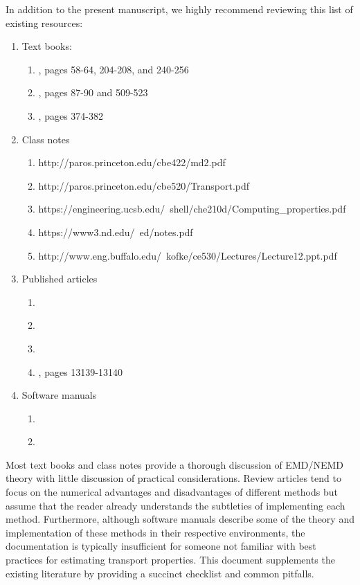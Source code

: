 \documentclass[9pt]{livecoms}
\begin{document}
In addition to the present manuscript, we highly recommend reviewing this list of existing resources:
\begin{enumerate}
	\item Text books:
	\begin{enumerate}
		\item \cite{Allen1987}, pages 58-64, 204-208, and 240-256
		\item \cite{Frenkel2002}, pages 87-90 and 509-523
		\item \cite{Leach2001}, pages 374-382
	\end{enumerate}
	\item Class notes
	\begin{enumerate}
		\item http://paros.princeton.edu/cbe422/md2.pdf
		\item http://paros.princeton.edu/cbe520/Transport.pdf
		\item https://engineering.ucsb.edu/~shell/che210d/Computing\_properties.pdf
		\item https://www3.nd.edu/~ed/notes.pdf
		\item http://www.eng.buffalo.edu/~kofke/ce530/Lectures/Lecture12.ppt.pdf
	\end{enumerate}
	\item Published articles
	\begin{enumerate}
		\item \cite{Hess2002}
		\item \cite{Chen2009}
		\item \cite{Ungerer2007}
		\item \cite{Nieto2015}, pages 13139-13140
	\end{enumerate}
	\item Software manuals
	\begin{enumerate}
		\item \cite{GROMACS}
		\item \cite{LAMMPS}
	\end{enumerate}
\end{enumerate}
Most text books and class notes provide a thorough discussion of EMD/NEMD theory with little discussion of practical considerations. Review articles tend to focus on the numerical advantages and disadvantages of different methods but assume that the reader already understands the subtleties of implementing each method. Furthermore, although software manuals describe some of the theory and implementation of these methods in their respective environments, the documentation is typically insufficient for someone not familiar with best practices for estimating transport properties. This document supplements the existing literature by providing a succinct checklist and common pitfalls.
\end{document}
